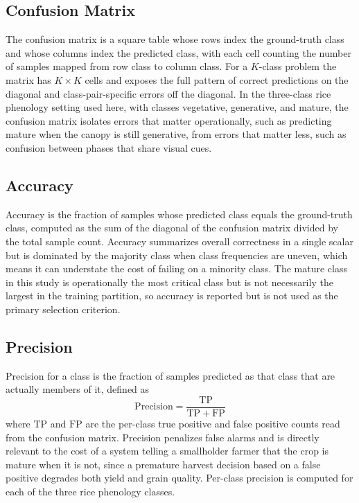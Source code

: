 \subsection{Confusion Matrix}

The confusion matrix is a square table whose rows index the ground-truth class and whose columns index the predicted class, with each cell counting the number of samples mapped from row class to column class. For a $K$-class problem the matrix has $K \times K$ cells and exposes the full pattern of correct predictions on the diagonal and class-pair-specific errors off the diagonal. In the three-class rice phenology setting used here, with classes vegetative, generative, and mature, the confusion matrix isolates errors that matter operationally, such as predicting mature when the canopy is still generative, from errors that matter less, such as confusion between phases that share visual cues.

\subsection{Accuracy}

Accuracy is the fraction of samples whose predicted class equals the ground-truth class, computed as the sum of the diagonal of the confusion matrix divided by the total sample count. Accuracy summarizes overall correctness in a single scalar but is dominated by the majority class when class frequencies are uneven, which means it can understate the cost of failing on a minority class. The mature class in this study is operationally the most critical class but is not necessarily the largest in the training partition, so accuracy is reported but is not used as the primary selection criterion.

\subsection{Precision}

Precision for a class is the fraction of samples predicted as that class that are actually members of it, defined as
\begin{equation}
    \mathrm{Precision} = \frac{\mathrm{TP}}{\mathrm{TP} + \mathrm{FP}}
    \label{eq:precision}
\end{equation}
where $\mathrm{TP}$ and $\mathrm{FP}$ are the per-class true positive and false positive counts read from the confusion matrix. Precision penalizes false alarms and is directly relevant to the cost of a system telling a smallholder farmer that the crop is mature when it is not, since a premature harvest decision based on a false positive degrades both yield and grain quality. Per-class precision is computed for each of the three rice phenology classes.

